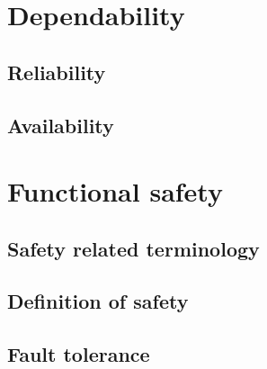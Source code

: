 \section{Dependability}
\subsection{Reliability}
\subsection{Availability}

\section{Functional safety}
\subsection{Safety related terminology}
\subsection{Definition of safety}
\subsection{Fault tolerance}